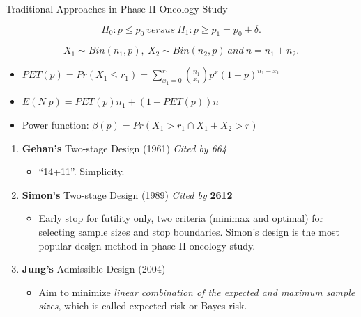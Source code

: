 \begin{frame}{Traditional Approaches in Phase II Oncology Study}

\[H_0: p \le p_0 \ versus \ H_1: p \ge p_1 = p_0 + \delta.\]

\[X_1 \sim Bin(n_1,p) ,\ X_2 \sim Bin(n_2,p) \ and \  n=n_1+n_2.\]

\begin{itemize}
\item
  \(PET(p)=Pr(X_1 \le r_1)=\sum\limits_{x_1=0}^{r_1} {n_1\choose x_1} p^x (1-p)^{n_1-x_1}\)
\item
  \(E(N|p)=PET(p) n_1+(1-PET(p))n\)
\item
  Power function: \(\beta(p) = Pr(X_1 > r_1 \cap X_1+X_2 > r)\)
\end{itemize}

\begin{enumerate}
\def\labelenumi{\arabic{enumi}.}
\tightlist
\item
  \textbf{Gehan's} Two-stage Design (1961) \emph{Cited by 664}

  \begin{itemize}
  \tightlist
  \item
    ``14+11''. Simplicity.
  \end{itemize}
\item
  \textbf{Simon's} Two-stage Design (1989) \emph{Cited by} \textbf{2612}

  \begin{itemize}
  \tightlist
  \item
    Early stop for futility only, two criteria (minimax and optimal) for
    selecting sample sizes and stop boundaries. Simon's design is the
    most popular design method in phase II oncology study.
  \end{itemize}
\item
  \textbf{Jung's} Admissible Design (2004)

  \begin{itemize}
  \tightlist
  \item
    Aim to minimize \emph{linear combination of the expected and maximum
    sample sizes}, which is called expected risk or Bayes risk.
  \end{itemize}
\end{enumerate}

\end{frame}

